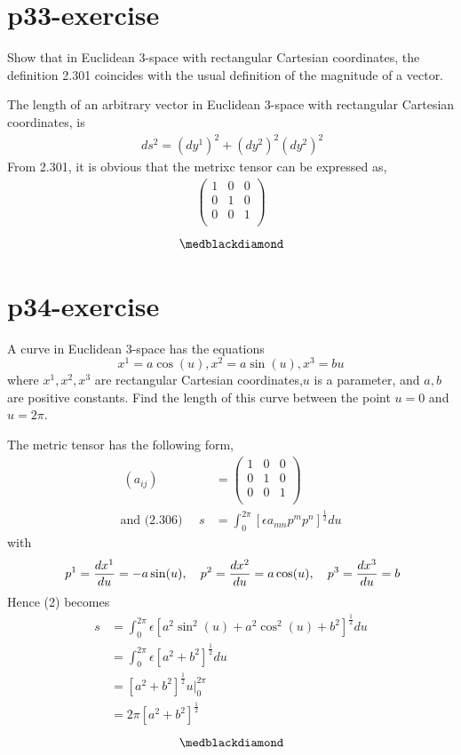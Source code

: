 \section{p33-exercise}
\begin{tcolorbox}
Show that in Euclidean 3-space with rectangular Cartesian coordinates, the definition 2.301 coincides with the usual definition of the magnitude of a vector.
\end{tcolorbox}
The length of an arbitrary vector in Euclidean 3-space with rectangular Cartesian coordinates, is
\begin{align}
\ ds^2 = (dy^1)^2 + (dy^2)^2 (dy^2)^2
\end {align}
From 2.301, it is obvious that the metrixc tensor can be expressed as,
\begin{align}
\begin{pmatrix}1 & 0 &0 \\ 0 & 1 &0\\0 & 0 &1  \\ \end{pmatrix} 
\end{align}
$$\medblackdiamond$$
\newpage


\section{p34-exercise}
\begin{tcolorbox}
A curve in Euclidean 3-space has the equations $$ x^1 =  a \cos(u), x^2 = a\sin(u), x^3 = bu$$ where $x^1, x^2,x^3$ are rectangular Cartesian coordinates,$u$ is a parameter, and $a, b$ are positive constants. Find the length of this curve between the point $u = 0$ and $u = 2\pi$.
\end{tcolorbox}
The metric tensor has the following form,
\begin{align}
\ (a_{ij}) &= \begin{pmatrix}1 & 0 &0 \\ 0 &1 &0\\0 & 0 &1  \\ \end{pmatrix} \\
\text {and  (2.306)  }\quad s &= \int^{2\pi}_0[\epsilon a_{mn}p^mp^n]^{\frac{1}{2}}du
\end{align}
with
\begin{align}
\ p^1 = \dv{x^1}{u} = -a\sin(u), \quad p^2 = \dv{x^2}{u} = a\cos(u), \quad p^3 = \dv{x^3}{u} = b
\end{align}
Hence (2) becomes
\begin{align}
s &= \int^{2\pi}_0\epsilon[a^2 \sin^2(u) + a^2\cos^2(u) + b^2]^{\frac{1}{2}}du\\
\ &= \int^{2\pi}_0\epsilon[a^2+  b^2]^{\frac{1}{2}}du\\
\ &= [a^2+  b^2]^{\frac{1}{2}} \left. u\right|^{2\pi}_0\\
\ &= 2\pi[a^2+  b^2]^{\frac{1}{2}} 
\end{align}
$$\medblackdiamond$$
\newpage

